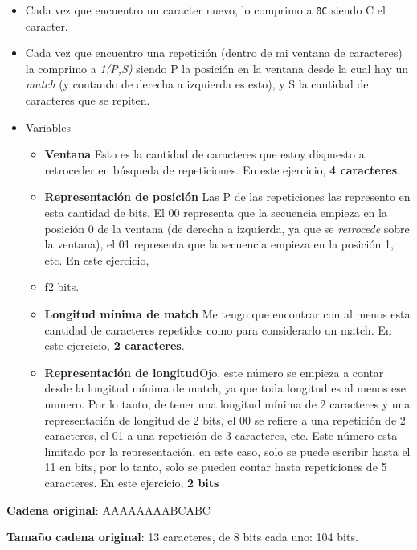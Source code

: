 \documentclass[a4paper]{article}
\begin{document}
	\begin{itemize}
		\item Cada vez que encuentro un caracter nuevo, lo comprimo a \texttt{0C} siendo C el caracter. 
		\item Cada vez que encuentro una repetición (dentro de mi ventana de caracteres) la comprimo a \textit{1(P,S)} siendo P la posición en la ventana desde la cual hay un \textit{match} (y contando de derecha a izquierda es esto), y S la cantidad de caracteres que se repiten.
		\item Variables
		\begin{itemize}
			\item \textbf{Ventana} Esto es la cantidad de caracteres que estoy dispuesto a retroceder en búsqueda de repeticiones. En este ejercicio, \textbf{4 caracteres}.
			\item \textbf{Representación de posición} Las P de las repeticiones las represento en esta cantidad de bits. El 00 representa que la secuencia empieza en la posición 0 de la ventana (de derecha a izquierda, ya que se \textit{retrocede} sobre la ventana), el 01 representa que la secuencia empieza en la posición 1, etc. En este ejercicio, 
			\item 
			
			f{2 bits}.
			\item \textbf{Longitud mínima de match} Me tengo que encontrar con al menos esta cantidad de caracteres repetidos como para considerarlo un match. En este ejercicio, \textbf{2 caracteres}. 
			\item \textbf{Representación de longitud}Ojo, este número se empieza a contar desde la longitud mínima de match, ya que toda longitud es al menos ese numero. Por lo tanto, de tener una longitud mínima de 2 caracteres y una representación de longitud de 2 bits, el 00 se refiere a una repetición de 2 caracteres, el 01 a una repetición de 3 caracteres, etc. Este número esta limitado por la representación, en este caso, solo se puede escribir hasta el 11 en bits, por lo tanto, solo se pueden contar hasta repeticiones de 5 caracteres. En este ejercicio, \textbf{2 bits}
		\end{itemize}
	\end{itemize}

	\textbf{Cadena original}: AAAAAAAABCABC
	
    \textbf{Tamaño cadena original}: 13 caracteres, de 8 bits cada uno: 104 bits.
	
\end{document}
